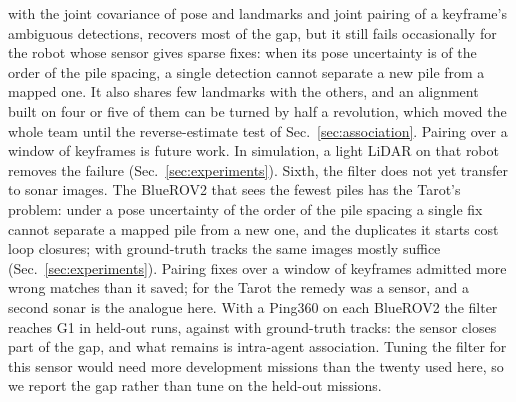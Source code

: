 with the joint covariance of pose and landmarks and joint pairing of a keyframe's ambiguous
detections, recovers most of the gap, but it still fails occasionally for the robot whose sensor
gives sparse fixes: when its pose uncertainty is of the order of the pile spacing, a single
detection cannot separate a new pile from a mapped one. It also shares few landmarks with the
others, and an alignment built on four or five of them can be turned by half a revolution, which
moved the whole team until the reverse-estimate test of Sec.~\ref{sec:association}. Pairing over a window of
keyframes is future work. In simulation, a light LiDAR on that robot removes the failure
(Sec.~\ref{sec:experiments}).
Sixth, the filter does not yet transfer to sonar images. The BlueROV2 that sees the fewest piles
has the Tarot's problem: under a pose uncertainty of the order of the pile spacing a single fix
cannot separate a mapped pile from a new one, and the duplicates it starts cost loop closures;
with ground-truth tracks the same images mostly suffice (Sec.~\ref{sec:experiments}). Pairing
fixes over a window of keyframes admitted more wrong matches than it saved; for the Tarot the
remedy was a sensor, and a second sonar is the analogue here. With a Ping360 on each BlueROV2
the filter reaches G1 in \sonarHeldTwoPEKFGOne{} held-out runs, against \sonarHeldTwoPGOne{}
with ground-truth tracks: the sensor closes part of the gap, and what remains is intra-agent
association. Tuning the filter for this sensor would need more development missions than the
twenty used here, so we report the gap rather than tune on the held-out missions.
